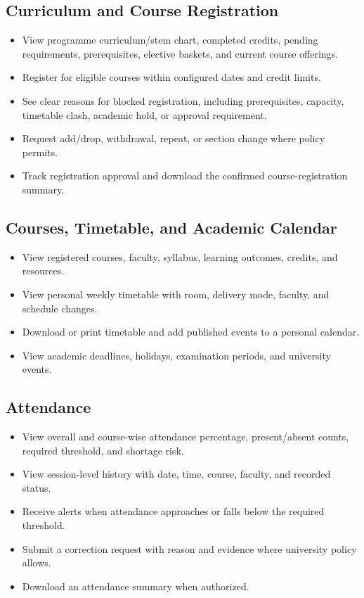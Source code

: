 \documentclass[10pt,a4paper]{article}
\begin{document}
\subsection{Curriculum and Course Registration}
\begin{itemize}
  \item View programme curriculum/stem chart, completed credits, pending requirements,
        prerequisites, elective baskets, and current course offerings.
  \item Register for eligible courses within configured dates and credit limits.
  \item See clear reasons for blocked registration, including prerequisites, capacity,
        timetable clash, academic hold, or approval requirement.
  \item Request add/drop, withdrawal, repeat, or section change where policy permits.
  \item Track registration approval and download the confirmed course-registration summary.
\end{itemize}

\subsection{Courses, Timetable, and Academic Calendar}
\begin{itemize}
  \item View registered courses, faculty, syllabus, learning outcomes, credits, and resources.
  \item View personal weekly timetable with room, delivery mode, faculty, and schedule changes.
  \item Download or print timetable and add published events to a personal calendar.
  \item View academic deadlines, holidays, examination periods, and university events.
\end{itemize}

\subsection{Attendance}
\begin{itemize}
  \item View overall and course-wise attendance percentage, present/absent counts,
        required threshold, and shortage risk.
  \item View session-level history with date, time, course, faculty, and recorded status.
  \item Receive alerts when attendance approaches or falls below the required threshold.
  \item Submit a correction request with reason and evidence where university policy allows.
  \item Download an attendance summary when authorized.
\end{itemize}
\end{document}
